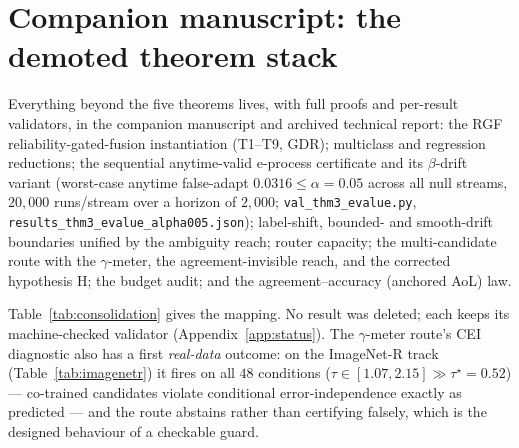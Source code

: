 \documentclass[conference]{IEEEtran}
\theoremstyle{plain}
\theoremstyle{definition}
\begin{document}
\section{Companion manuscript: the demoted theorem stack}\label{app:stack}\label{app:theory-ext}\label{app:anytime}
Everything beyond the five theorems lives, with full proofs and per-result validators, in
the companion manuscript and archived technical report: the RGF reliability-gated-fusion
instantiation (T1--T9, GDR); multiclass and regression reductions; the sequential
anytime-valid e-process certificate and its $\beta$-drift variant (worst-case anytime
false-adapt $0.0316\le\alpha{=}0.05$ across all null streams, $20{,}000$ runs/stream over a
horizon of $2{,}000$; \texttt{val\_thm3\_evalue.py},
\texttt{results\_thm3\_evalue\_alpha005.json}); label-shift, bounded-
and smooth-drift boundaries unified by the ambiguity reach; router capacity; the
multi-candidate route with the $\gamma$-meter, the agreement-invisible reach, and the
corrected hypothesis H; the budget audit; and the agreement--accuracy (anchored AoL) law.
\begin{table}[t]\centering\small
{}
\caption{The five-theorem consolidation. Fifty-plus prior numbered results survive as
corollaries or manuscript sections; none was deleted, and every one keeps its
machine-checked validator.}
\label{tab:consolidation}
\end{table}
Table~\ref{tab:consolidation} gives the mapping. No result was deleted; each keeps its
machine-checked validator (Appendix~\ref{app:status}). The $\gamma$-meter route's CEI
diagnostic also has a first \emph{real-data} outcome: on the ImageNet-R track
(Table~\ref{tab:imagenetr}) it fires on all $48$ conditions
($\tau\in[1.07,2.15]\gg\tau^\star{=}0.52$) --- co-trained candidates violate conditional
error-independence exactly as predicted --- and the route abstains rather than
certifying falsely, which is the designed behaviour of a checkable guard.
\end{document}

